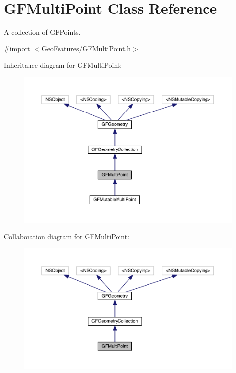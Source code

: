 \hypertarget{interface_g_f_multi_point}{}\section{G\+F\+Multi\+Point Class Reference}
\label{interface_g_f_multi_point}


A collection of G\+F\+Points.  




{\ttfamily \#import $<$Geo\+Features/\+G\+F\+Multi\+Point.\+h$>$}



Inheritance diagram for G\+F\+Multi\+Point\+:\nopagebreak
\begin{figure}[H]
\begin{center}
\leavevmode
\includegraphics[width=350pt]{interface_g_f_multi_point__inherit__graph}
\end{center}
\end{figure}


Collaboration diagram for G\+F\+Multi\+Point\+:\nopagebreak
\begin{figure}[H]
\begin{center}
\leavevmode
\includegraphics[width=350pt]{interface_g_f_multi_point__coll__graph}
\end{center}
\end{figure}
